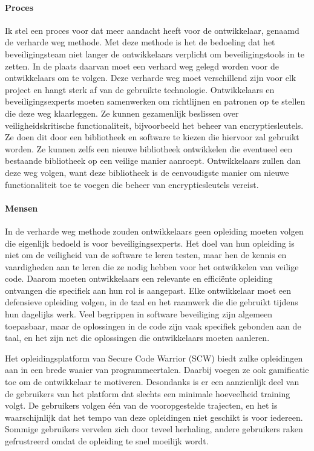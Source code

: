 \paragraph{Proces}
Ik stel een proces voor dat meer aandacht heeft voor de ontwikkelaar, genaamd de verharde weg methode.
Met deze methode is het de bedoeling dat het beveiligingsteam niet langer de ontwikkelaars verplicht om beveiligingstools in te zetten.
In de plaats daarvan moet een verhard weg gelegd worden voor de ontwikkelaars om te volgen.
Deze verharde weg moet verschillend zijn voor elk project en hangt sterk af van de gebruikte technologie.
Ontwikkelaars en beveiligingsexperts moeten samenwerken om richtlijnen en patronen op te stellen die deze weg klaarleggen.
Ze kunnen gezamenlijk beslissen over veiligheidskritische functionaliteit, bijvoorbeeld het beheer van encryptiesleutels.
Ze doen dit door een bibliotheek en software te kiezen die hiervoor zal gebruikt worden.
Ze kunnen zelfs een nieuwe bibliotheek ontwikkelen die eventueel een bestaande bibliotheek op een veilige manier aanroept.
Ontwikkelaars zullen dan deze weg volgen, want deze bibliotheek is de eenvoudigste manier om nieuwe functionaliteit toe te voegen die beheer van encryptiesleutels vereist.

\paragraph{Mensen}
In de verharde weg methode zouden ontwikkelaars geen opleiding moeten volgen die eigenlijk bedoeld is voor beveiligingsexperts.
Het doel van hun opleiding is niet om de veiligheid van de software te leren testen, maar hen de kennis en vaardigheden aan te leren die ze nodig hebben voor het ontwikkelen van veilige code.
Daarom moeten ontwikkelaars een relevante en efficiënte opleiding ontvangen die specifiek aan hun rol is aangepast.
Elke ontwikkelaar moet een defensieve opleiding volgen, in de taal en het raamwerk die die gebruikt tijdens hun dagelijks werk.
Veel begrippen in software beveiliging zijn algemeen toepasbaar, maar de oplossingen in de code zijn vaak specifiek gebonden aan de taal, en het zijn net die oplossingen die ontwikkelaars moeten aanleren.

Het opleidingsplatform van Secure Code Warrior (SCW) biedt zulke opleidingen aan in een brede waaier van programmeertalen.
Daarbij voegen ze ook gamificatie toe om de ontwikkelaar te motiveren.
Desondanks is er een aanzienlijk deel van de gebruikers van het platform dat slechts een minimale hoeveelheid training volgt.
De gebruikers volgen één van de vooropgestelde trajecten, en het is waarschijnlijk dat het tempo van deze opleidingen niet geschikt is voor iedereen.
Sommige gebruikers vervelen zich door teveel herhaling, andere gebruikers raken gefrustreerd omdat de opleiding te snel moeilijk wordt.

